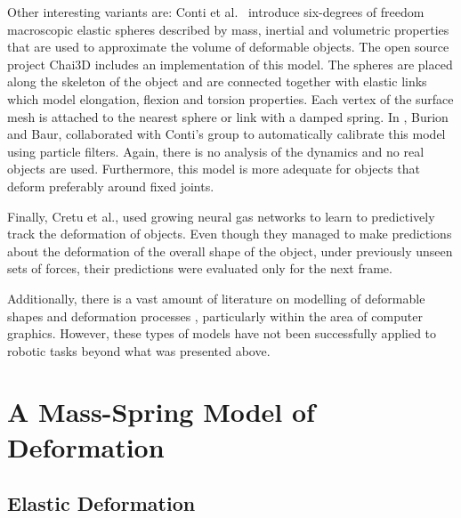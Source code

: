 \documentclass[journal]{IEEEtran}
\begin{document}
Other interesting variants are: Conti et al.\ \cite{Conti2003} introduce six-degrees of freedom macroscopic elastic spheres described by mass, inertial and volumetric properties that are used to approximate the volume of deformable objects. The open source project Chai3D includes an implementation of this model. The spheres are placed along the skeleton of the object and are connected together with elastic links which model elongation, flexion and torsion properties. Each vertex of the surface mesh is attached to the nearest sphere or link with a damped spring.  In \cite{Burion2008}, Burion and Baur, collaborated with Conti's group to automatically calibrate this model using particle filters.  Again, there is no analysis of the dynamics and no real objects are used.  Furthermore, this model is more adequate for objects that deform preferably around fixed joints.

Finally, Cretu et al., used growing neural gas networks to learn to predictively track the deformation of objects.  Even though they managed to make predictions about the deformation of the overall shape of the object, under previously unseen sets of forces, their predictions were evaluated only for the next frame.

Additionally, there is a vast amount of literature on modelling of deformable shapes and deformation processes \cite{Gibson1997, McInerney1996, Montagnat2001, Moore2007review, Nealen2006review}, particularly within the area of computer graphics.  However, these types of models have not been successfully applied to robotic tasks beyond what was presented above.


\section{A Mass-Spring Model of Deformation}
\label{sec:model}
\subsection{Elastic Deformation}
\end{document}
